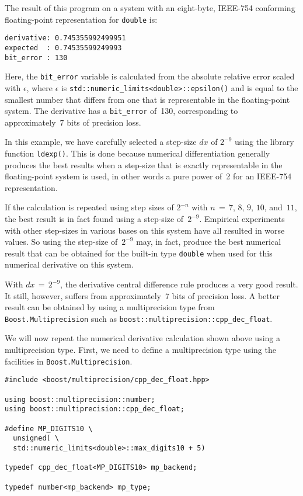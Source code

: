\documentclass{article}[10pt]
\begin{document}
The result of this program on a system with an eight-byte,
IEEE-754 conforming floating-point representation for
{\lstinline|double|} is:

\begin{lstlisting}
derivative: 0.745355992499951
expected  : 0.74535599249993
bit_error : 130
\end{lstlisting}

Here, the {\lstinline|bit_error|} variable
is calculated from the absolute
relative error scaled with $\epsilon$, where $\epsilon$
is {\lstinline|std::numeric_limits<double>::epsilon()|}
and is equal to the smallest number that differs from
one that is representable in the floating-point system.
The derivative has a {\lstinline|bit_error|} of~130,
corresponding to approximately~7 bits of precision loss.

In this example, we have carefully selected a step-size
$dx$ of $2^{-9}$ using the library function {\lstinline|ldexp()|}.
This is done because numerical differentiation
generally produces the best results when a step-size
that is exactly representable in the floating-point
system is used, in other words a pure power of~2
for an IEEE-754 representation.

If the calculation is repeated using step sizes of
$2^{-n}$ with $n\,=\,7,\,8,\,9,\,10$, and~$11$,
the best result is in fact found using
a step-size of~$2^{-9}$.
Empirical experiments with other step-sizes in various
bases on this system have all resulted in worse values.
So using the step-size of~$2^{-9}$ may, in fact,
produce the best numerical result that can be obtained
for the built-in type {\lstinline|double|} when used for
this numerical derivative on this system.

With $dx\,=\,2^{-9}$, the derivative central difference rule
produces a very good result. It still, however, suffers
from approximately~7 bits of precision loss. A better result
can be obtained by using a multiprecision type from
{\lstinline|Boost.Multiprecision|} such as
{\lstinline|boost::multiprecision::cpp_dec_float|}.

We will now repeat the numerical derivative calculation
shown above using a multiprecision type. First, we need to
define a multiprecision type using the facilities in
{\lstinline|Boost.Multiprecision|}.

\begin{lstlisting}
#include <boost/multiprecision/cpp_dec_float.hpp>

using boost::multiprecision::number;
using boost::multiprecision::cpp_dec_float;

#define MP_DIGITS10 \
  unsigned( \
  std::numeric_limits<double>::max_digits10 + 5)

typedef cpp_dec_float<MP_DIGITS10> mp_backend;

typedef number<mp_backend> mp_type;
\end{lstlisting}
\end{document}
